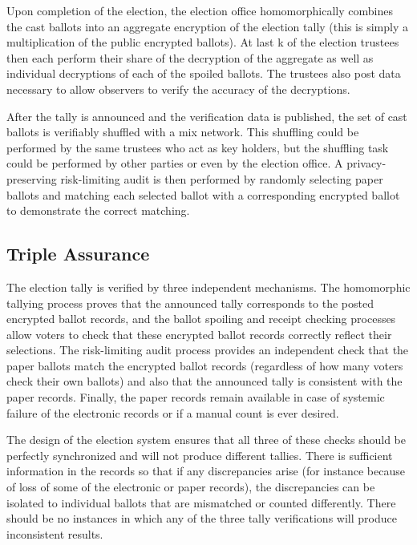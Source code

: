 Upon completion of the election, the election office homomorphically combines the cast ballots into an aggregate encryption of the election tally (this is simply a multiplication of the public encrypted ballots).  At last k of the election trustees then each perform their share of the decryption of the aggregate as well as individual decryptions of each of the spoiled ballots.  The trustees also post data necessary to allow observers to verify the accuracy of the decryptions.

After the tally is announced and the verification data is published, the set of cast ballots is verifiably shuffled with a mix network.  This shuffling could be performed by the same trustees who act as key holders, but the shuffling task could be performed by other parties or even by the election office.  A privacy-preserving risk-limiting audit is then performed by randomly selecting paper ballots and matching each selected ballot with a corresponding encrypted ballot to demonstrate the correct matching.

\subsection{Triple Assurance}

The election tally is verified by three independent mechanisms.  The homomorphic tallying process proves that the announced tally corresponds to the posted encrypted ballot records, and the ballot spoiling and receipt checking processes allow voters to check that these encrypted ballot records correctly reflect their selections.  The risk-limiting audit process provides an independent check that the paper ballots match the encrypted ballot records (regardless of how many voters check their own ballots) and also that the announced tally is consistent with the paper records.  Finally, the paper records remain available in case of systemic failure of the electronic records or if a manual count is ever desired.

The design of the election system ensures that all three of these checks should be perfectly synchronized and will not produce different tallies.  There is sufficient information in the records so that if any discrepancies arise (for instance because of loss of some of the electronic or paper records), the discrepancies can be isolated to individual ballots that are mismatched or counted differently.  There should be no instances in which any of the three tally verifications will produce inconsistent results.


